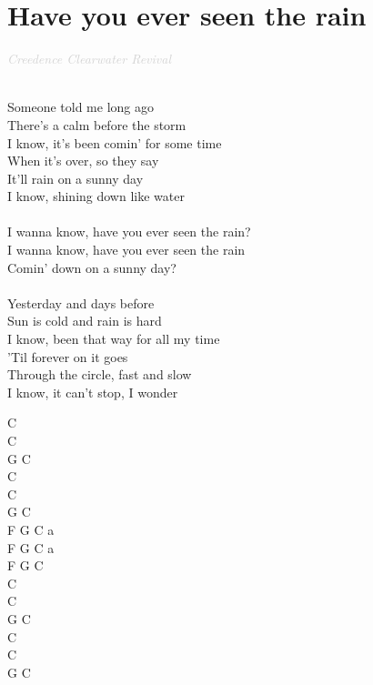 \documentclass[a5paper, 10pt]{book}
\begin{document}
\section{Have you ever seen the rain}\textcolor{lightgray}{\textit{Creedence Clearwater Revival}}\\~\\
\begin{minipage}[t]{0.7\textwidth}
Someone told me long ago\\
There's a calm before the storm\\
I know, it's been comin' for some time\\
When it's over, so they say\\
It'll rain on a sunny day\\
I know, shining down like water\\
\\
I wanna know, have you ever seen the rain?\\
I wanna know, have you ever seen the rain\\
Comin' down on a sunny day?\\
\\
Yesterday and days before\\
Sun is cold and rain is hard\\
I know, been that way for all my time\\
'Til forever on it goes\\
Through the circle, fast and slow\\
I know, it can't stop, I wonder\\
\end{minipage}
\begin{minipage}[t]{0.3\textwidth}
C\\ C\\
G C\\
C\\ C\\
G C\\

F G C a\\
F G C a\\
F G C\\

C\\ C\\
G C\\
C\\ C\\
G C\\
\end{minipage}
\end{document}
